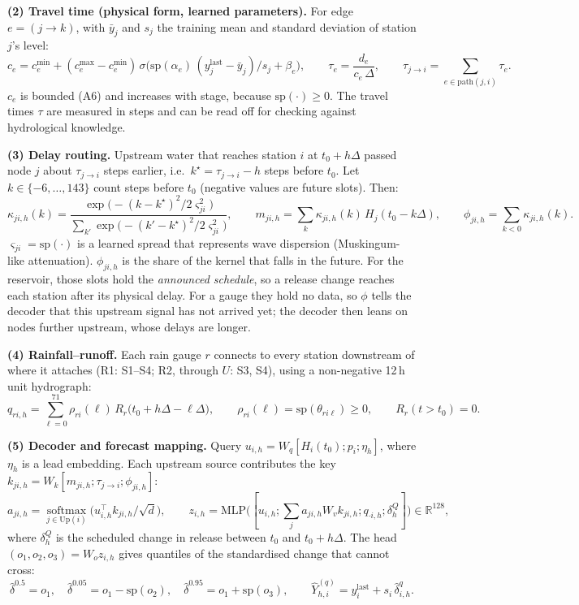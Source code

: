 \textbf{(2) Travel time (physical form, learned parameters).} For edge $e=(j\to k)$, with $\bar y_j$ and $s_j$ the
training mean and standard deviation of station $j$'s level:
\[
c_e = c^{\min}_e+(c^{\max}_e-c^{\min}_e)\,\sigma\!\big(\mathrm{sp}(\alpha_e)\,(y^{\text{last}}_j-\bar y_j)/s_j+\beta_e\big),\qquad
\tau_e=\frac{d_e}{c_e\,\Delta},\qquad \tau_{j\to i}=\sum_{e\in \mathrm{path}(j,i)}\tau_e .
\]
$c_e$ is bounded (A6) and increases with stage, because $\mathrm{sp}(\cdot)\ge0$. The travel times $\tau$ are
measured in steps and can be read off for checking against hydrological knowledge.

\textbf{(3) Delay routing.} Upstream water that reaches station $i$ at $t_0+h\Delta$ passed node $j$ about
$\tau_{j\to i}$ steps earlier, i.e.\ $k^\star=\tau_{j\to i}-h$ steps before $t_0$. Let $k\in\{-6,\dots,143\}$
count steps before $t_0$ (negative values are future slots). Then:
\[
\kappa_{ji,h}(k)=\frac{\exp\!\big(-(k-k^\star)^2/2\varsigma_{ji}^2\big)}{\sum_{k'}\exp\!\big(-(k'-k^\star)^2/2\varsigma_{ji}^2\big)},\qquad
m_{ji,h}=\sum_k\kappa_{ji,h}(k)\,H_j(t_0-k\Delta),\qquad \phi_{ji,h}=\sum_{k<0}\kappa_{ji,h}(k).
\]
$\varsigma_{ji}=\mathrm{sp}(\cdot)$ is a learned spread that represents wave dispersion (Muskingum-like attenuation).
$\phi_{ji,h}$ is the share of the kernel that falls in the future. For the reservoir, those slots hold the
\emph{announced schedule}, so a release change reaches each station after its physical delay. For a gauge they
hold no data, so $\phi$ tells the decoder that this upstream signal has not arrived yet; the decoder then leans
on nodes further upstream, whose delays are longer.

\textbf{(4) Rainfall--runoff.} Each rain gauge $r$ connects to every station downstream of where it attaches
(R1: S1--S4; R2, through $U$: S3, S4), using a non-negative 12\,h unit hydrograph:
\[
q_{ri,h}=\sum_{\ell=0}^{71}\rho_{ri}(\ell)\,R_r\big(t_0+h\Delta-\ell\Delta\big),\qquad \rho_{ri}(\ell)=\mathrm{sp}(\theta_{ri\ell})\ge0,\qquad R_r(t>t_0)=0 .
\]

\textbf{(5) Decoder and forecast mapping.} Query $u_{i,h}=W_q[H_i(t_0);p_i;\eta_h]$, where $\eta_h$ is a lead
embedding. Each upstream source contributes the key $k_{ji,h}=W_k[m_{ji,h};\tau_{j\to i};\phi_{ji,h}]$:
\[
a_{ji,h}=\operatorname*{softmax}_{j\in\mathrm{Up}(i)}\!\big(u_{i,h}^{\top}k_{ji,h}/\sqrt d\big),\qquad
z_{i,h}=\mathrm{MLP}\big([u_{i,h};\textstyle\sum_j a_{ji,h}W_vk_{ji,h};q_{\cdot i,h};\delta^{Q}_h]\big)\in\mathbb R^{128},
\]
where $\delta^Q_h$ is the scheduled change in release between $t_0$ and $t_0+h\Delta$. The head
$(o_1,o_2,o_3)=W_oz_{i,h}$ gives quantiles of the standardised change that cannot cross:
\[
\hat\delta^{0.5}=o_1,\quad \hat\delta^{0.05}=o_1-\mathrm{sp}(o_2),\quad \hat\delta^{0.95}=o_1+\mathrm{sp}(o_3),\qquad
\hat Y^{(q)}_{h,i}=y^{\text{last}}_i+s_i\,\hat\delta^{q}_{i,h}.
\]

